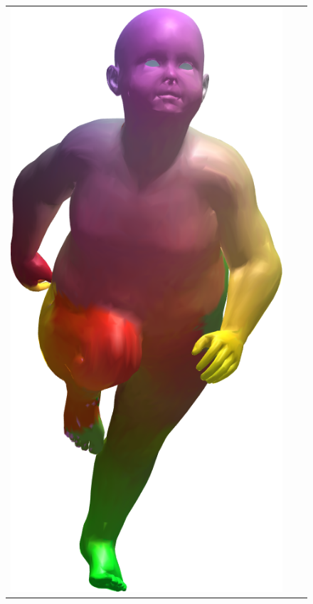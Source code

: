 \begin{figure}[h!]
\begin{tabular}{ccc}
		\includegraphics[scale=0.2]{figures/kid23_kid22_PFM.png} &

\end{tabular}
\end{figure}
